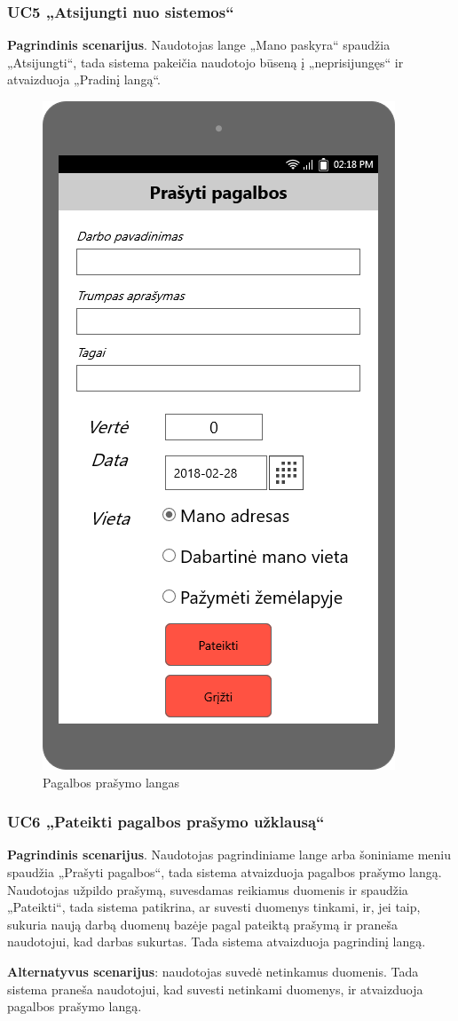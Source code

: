 \documentclass{VUMIFPSbakalaurinis}
\begin{document}
\subsubsection{UC5 „Atsijungti nuo sistemos“}
\textbf{Pagrindinis scenarijus}. Naudotojas lange „Mano paskyra“ spaudžia „Atsijungti“, tada sistema pakeičia naudotojo būseną į „neprisijungęs“ ir atvaizduoja „Pradinį langą“.

\begin{figure}[H]
	\centering
	\includegraphics[scale=0.4]{img/ScreenShots/Prašyti_pagalbos/00-Prašyti-pagalbos}
	\caption{Pagalbos prašymo langas}
	\label{img:help}
\end{figure}
\subsubsection{UC6 „Pateikti pagalbos prašymo užklausą“}
\textbf{Pagrindinis scenarijus}. Naudotojas pagrindiniame lange arba šoniniame meniu spaudžia „Prašyti pagalbos“, tada sistema atvaizduoja pagalbos prašymo langą. Naudotojas užpildo prašymą, suvesdamas reikiamus duomenis ir spaudžia „Pateikti“, tada sistema patikrina, ar suvesti duomenys tinkami, ir, jei taip, sukuria naują darbą duomenų bazėje pagal pateiktą prašymą ir praneša naudotojui, kad darbas sukurtas. Tada sistema atvaizduoja pagrindinį langą.
\par \textbf{Alternatyvus scenarijus}: naudotojas suvedė netinkamus duomenis. Tada sistema praneša naudotojui, kad suvesti netinkami duomenys, ir atvaizduoja pagalbos prašymo langą.
\end{document}
